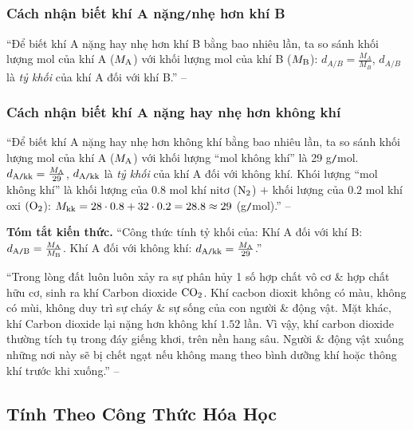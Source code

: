 \documentclass{article}
\numberwithin{equation}{section}
\begin{document}
\subsubsection{Cách nhận biết khí A nặng\texttt{/}nhẹ hơn khí B}
``Để biết khí A nặng hay nhẹ hơn khí B bằng bao nhiêu lần, ta so sánh khối lượng mol của khí A ($M_{\rm A}$) với khối lượng mol của khí B ($M_{\rm B}$): $d_{A\texttt{/}B} = \frac{M_A}{M_B}$, $d_{A\texttt{/}B}$ là \textit{tỷ khối} của khí A đối với khí B.'' -- \cite[p. 68]{SGK_Hoa_Hoc_8}

\subsubsection{Cách nhận biết khí A nặng hay nhẹ hơn không khí}
``Để biết khí A nặng hay nhẹ hơn không khí bằng bao nhiêu lần, ta so sánh khối lượng mol của khí A ($M_{\rm A}$) với khối lượng ``mol không khí'' là 29 g\texttt{/}mol. $d_{\rm A\texttt{/}kk} = \frac{M_{\rm A}}{29}$, $d_{\rm A\texttt{/}kk}$ là \textit{tỷ khối} của khí A đối với không khí. Khói lượng ``mol không khí'' là khối lượng của $0.8$ mol khí nitơ ($\rm N_2$) $+$ khối lượng của $0.2$ mol khí oxi $(\rm O_2$): $M_{\rm kk} = 28\cdot 0.8 + 32\cdot 0.2 = 28.8\approx 29$ (g\texttt{/}mol).'' -- \cite[p. 68]{SGK_Hoa_Hoc_8}
\vspace{2mm}

\noindent\textbf{Tóm tắt kiến thức.} ``Công thức tính tỷ khối của: Khí A đối với khí B: $d_{\rm A\texttt{/}B} = \frac{M_{\rm A}}{M_{\rm B}}$. Khí A đối với không khí: $d_{\rm A\texttt{/}kk} = \frac{M_{\rm A}}{29}$.''

``Trong lòng đất luôn luôn xảy ra sự phân hủy 1 số hợp chất vô cơ \& hợp chất hữu cơ, sinh ra khí Carbon dioxide $\rm CO_2$. Khí cacbon dioxit không có màu, không có mùi, không duy trì sự cháy \& sự sống của con người \& động vật. Mặt khác, khí Carbon dioxide lại nặng hơn không khí $1.52$ lần. Vì vậy, khí carbon dioxide thường tích tụ trong đáy giếng khơi, trên nền hang sâu. Người \& động vật xuống những nơi này sẽ bị chết ngạt nếu không mang theo bình dưỡng khí hoặc thông khí trước khi xuống.'' -- \cite[p. 69]{SGK_Hoa_Hoc_8}


\subsection{Tính Theo Công Thức Hóa Học}

\end{document}

